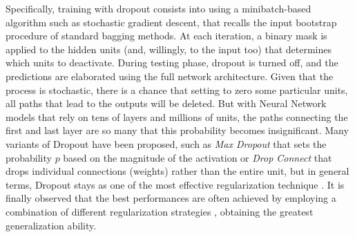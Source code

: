 \documentclass[binding=0.7cm, oneside]{sapthesis}
\begin{document}
Specifically, training with dropout consists into using a minibatch-based algorithm such as stochastic gradient descent, that recalls the input bootstrap procedure of standard bagging methods. At each iteration,
a binary mask is applied to the hidden units (and, willingly, to the input too) that determines which units to deactivate. During testing phase, dropout is turned off, and the predictions are elaborated using
the full network architecture. Given that the process is stochastic, there is a chance that setting to zero some particular units, all paths that lead to the outputs will be deleted. But with Neural Network models that rely on
tens of layers and millions of units, the paths connecting the first and last layer are so many that this probability becomes insignificant. Many variants of Dropout have been proposed, such as \emph{Max Dropout} that sets the
probability $p$ based on the magnitude of the activation or \emph{Drop Connect} that drops individual connections (weights) rather than the entire unit, but in general terms, Dropout stays as one of the most effective regularization
technique \cite{regular_comparison}. It is finally observed that the best performances are often achieved by employing a combination of different regularization strategies \cite{regular_combining,survey_regular}, obtaining the greatest generalization ability.



\end{document}
